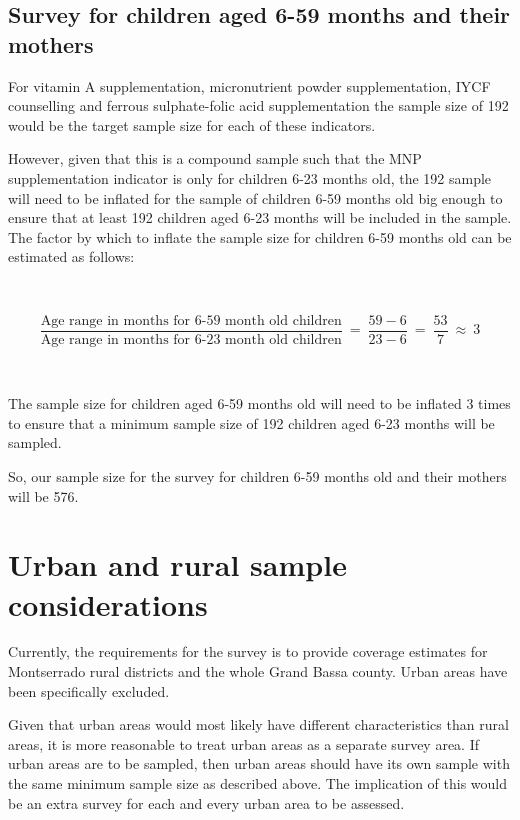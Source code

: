 \documentclass[12pt,a4paper]{book}
\theoremstyle{definition}
\theoremstyle{definition}
\theoremstyle{definition}
\theoremstyle{remark}
\begin{document}
\hypertarget{survey-for-children-aged-6-59-months-and-their-mothers}{%
\subsection{Survey for children aged 6-59 months and their
mothers}\label{survey-for-children-aged-6-59-months-and-their-mothers}}

For vitamin A supplementation, micronutrient powder supplementation,
IYCF counselling and ferrous sulphate-folic acid supplementation the
sample size of 192 would be the target sample size for each of these
indicators.

However, given that this is a compound sample such that the MNP
supplementation indicator is only for children 6-23 months old, the 192
sample will need to be inflated for the sample of children 6-59 months
old big enough to ensure that at least 192 children aged 6-23 months
will be included in the sample. The factor by which to inflate the
sample size for children 6-59 months old can be estimated as follows:

~

\[ \frac{\text{Age range in months for 6-59 month old children}}{\text{Age range in months for 6-23 month old children}} ~ = ~ \frac{59 - 6}{23 - 6} ~ = ~ \frac{53}{7} ~ \approx ~ 3 \]

~

The sample size for children aged 6-59 months old will need to be
inflated 3 times to ensure that a minimum sample size of 192 children
aged 6-23 months will be sampled.

So, our sample size for the survey for children 6-59 months old and
their mothers will be 576.

\hypertarget{urbanrural}{%
\section{Urban and rural sample considerations}\label{urbanrural}}

Currently, the requirements for the survey is to provide coverage
estimates for Montserrado rural districts and the whole Grand Bassa
county. Urban areas have been specifically excluded.

Given that urban areas would most likely have different characteristics
than rural areas, it is more reasonable to treat urban areas as a
separate survey area. If urban areas are to be sampled, then urban areas
should have its own sample with the same minimum sample size as
described above. The implication of this would be an extra survey for
each and every urban area to be assessed.
\end{document}

